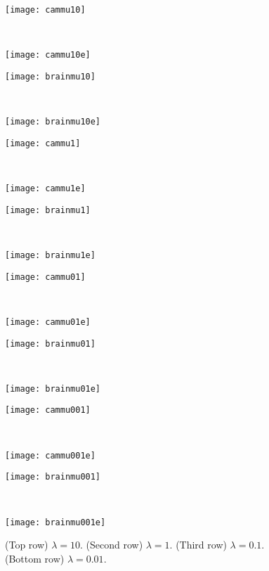 \begin{figure}[htb!]
	\centering
	
	\begin{minipage}{0.23\textwidth}
		\texttt{[image: cammu10]}
	\end{minipage}\,
	\begin{minipage}{0.23\textwidth}
		\texttt{[image: cammu10e]}
	\end{minipage}\quad 
	\begin{minipage}{0.23\textwidth}
		\texttt{[image: brainmu10]}
	\end{minipage}\,
	\begin{minipage}{0.23\textwidth}
		\texttt{[image: brainmu10e]}
	\end{minipage}
	
	\begin{minipage}{0.23\textwidth}
		\texttt{[image: cammu1]}
	\end{minipage}\,
	\begin{minipage}{0.23\textwidth}
		\texttt{[image: cammu1e]}
	\end{minipage}\quad 
	\begin{minipage}{0.23\textwidth}
		\texttt{[image: brainmu1]}
	\end{minipage}\,
	\begin{minipage}{0.23\textwidth}
		\texttt{[image: brainmu1e]}
	\end{minipage}
	
	\begin{minipage}{0.23\textwidth}
		\texttt{[image: cammu01]}
	\end{minipage}\,
	\begin{minipage}{0.23\textwidth}
		\texttt{[image: cammu01e]}
	\end{minipage}\quad
	\begin{minipage}{0.23\textwidth}
		\texttt{[image: brainmu01]}
	\end{minipage}\,
	\begin{minipage}{0.23\textwidth}
		\texttt{[image: brainmu01e]}
	\end{minipage}
	
	\begin{minipage}{0.23\textwidth}
		\texttt{[image: cammu001]}
	\end{minipage}\,
	\begin{minipage}{0.23\textwidth}
		\texttt{[image: cammu001e]}
	\end{minipage}\quad 
	\begin{minipage}{0.23\textwidth}
		\texttt{[image: brainmu001]}
	\end{minipage}\,
	\begin{minipage}{0.23\textwidth}
		\texttt{[image: brainmu001e]}
	\end{minipage}
	\caption{(Top row) $\lambda = 10$. (Second row) $\lambda = 1$. (Third row) $\lambda = 0.1$. (Bottom row) $\lambda = 0.01$. }
	\label{fig:diff_lam}
\end{figure}

